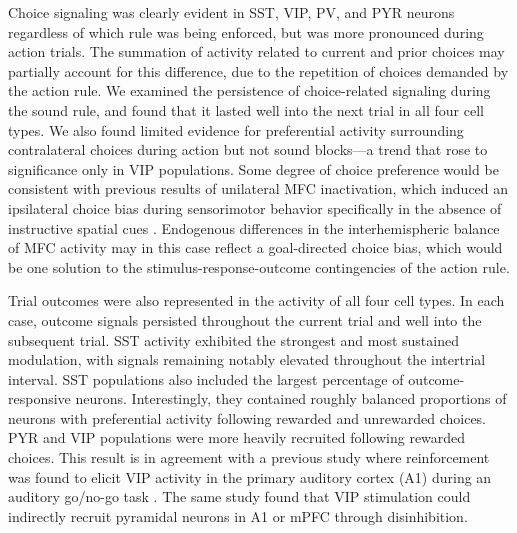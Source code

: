 Choice signaling was clearly evident in SST, VIP, PV, and PYR neurons regardless of which rule was being enforced, but was more pronounced during action trials. The summation of activity related to current and prior choices may partially account for this difference, due to the repetition of choices demanded by the action rule. We examined the persistence of choice-related signaling during the sound rule, and found that it lasted well into the next trial in all four cell types. We also found limited evidence for preferential activity surrounding contralateral choices during action but not sound blocks---a trend that rose to significance only in VIP populations. Some degree of choice preference would be consistent with previous results of unilateral MFC inactivation, which induced an ipsilateral choice bias during sensorimotor behavior specifically in the absence of instructive spatial cues \citep{erlich2011cortical,erlich2015distinct,hanks2015distinct}. Endogenous differences in the interhemispheric balance of MFC activity may in this case reflect a goal-directed choice bias, which would be one solution to the stimulus-response-outcome contingencies of the action rule.

Trial outcomes were also represented in the activity of all four cell types. In each case, outcome signals persisted throughout the current trial and well into the subsequent trial. SST activity exhibited the strongest and most sustained modulation, with signals remaining notably elevated throughout the intertrial interval. SST populations also included the largest percentage of outcome-responsive neurons. Interestingly, they contained roughly balanced proportions of neurons with preferential activity following rewarded and unrewarded choices. PYR and VIP populations were more heavily recruited following rewarded choices. This result is in agreement with a previous study where reinforcement was found to elicit VIP activity in the primary auditory cortex (A1) during an auditory go/no-go task \citep{pi13}. The same study found that VIP stimulation could indirectly recruit pyramidal neurons in A1 or mPFC through disinhibition.  

